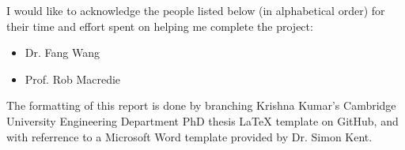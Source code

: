 
\begin{acknowledgements}      

I would like to acknowledge the people listed below (in alphabetical order) for their time and effort spent on helping me complete the project:

\begin{itemize}
    \item Dr. Fang Wang
    \item Prof. Rob Macredie
\end{itemize}

The formatting of this report is done by branching Krishna Kumar's Cambridge University Engineering Department PhD thesis LaTeX template on GitHub, and with referrence to a Microsoft Word template provided by Dr. Simon Kent.

\end{acknowledgements}
